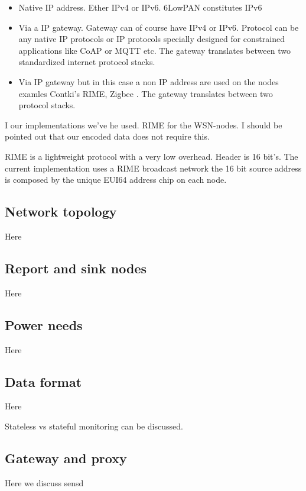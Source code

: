 \documentclass[conference, a4paper,10pt,twocolumn]{IEEEtran}
\begin{document}
\begin{itemize}

\item Native IP address. Ether IPv4 or IPv6. 6LowPAN constitutes IPv6


\item Via a IP gateway. Gateway can of course have IPv4 or IPv6. Protocol
can be any native IP protocols or IP protocols specially designed 
for constrained applications like CoAP or MQTT etc. The gateway 
translates between two standardized internet protocol stacks. 


\item  Via IP gateway but in this case a non IP address are used on
the nodes examles Contki's RIME, Zigbee . The gateway translates 
between two protocol stacks. 

\end{itemize}

I our implementations we've he used. RIME for the WSN-nodes. I should
be pointed out that our encoded data does not require this.

RIME is a lightweight protocol with a very low overhead. Header is 
16 bit's. The current implementation uses a RIME broadcast network
the 16 bit source address is composed by the unique EUI64 address
chip on each node.




\subsection{Network topology}
Here

\subsection{Report and sink nodes}
Here

\subsection{Power needs}
Here

\subsection{Data format}
Here

Stateless vs stateful monitoring can be discussed. 


\subsection{Gateway and proxy}
Here we discuss sensd ~\cite{sensd}
\end{document}
